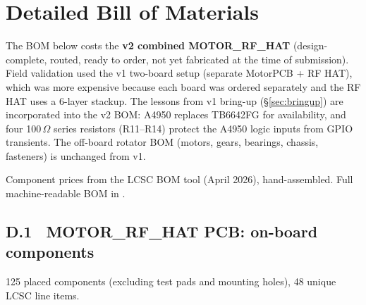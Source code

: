 \chapter{Detailed Bill of Materials}
\label{app:bom}

The BOM below costs the \textbf{v2 combined MOTOR\_RF\_HAT} (design-complete, routed, ready to order, not yet fabricated at the time of submission). Field validation used the v1 two-board setup (separate MotorPCB + RF HAT), which was more expensive because each board was ordered separately and the RF HAT uses a 6-layer stackup. The lessons from v1 bring-up (\S\ref{sec:bringup}) are incorporated into the v2 BOM: A4950 replaces TB6642FG for availability, and four 100\,$\Omega$ series resistors (R11--R14) protect the A4950 logic inputs from GPIO transients. The off-board rotator BOM (motors, gears, bearings, chassis, fasteners) is unchanged from v1.

Component prices from the LCSC BOM tool (April 2026), hand-assembled. Full machine-readable BOM in .

\section*{D.1 \ MOTOR\_RF\_HAT PCB: on-board components}

125 placed components (excluding test pads and mounting holes), 48 unique LCSC line items.

